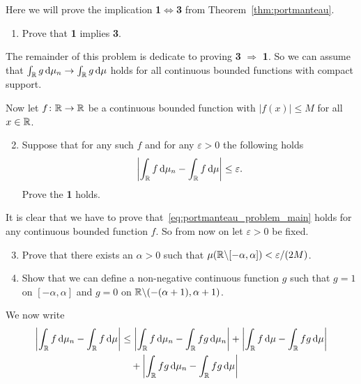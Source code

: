 \begin{problem}\label{prb:portmanteau}
Here we will prove the implication \textbf{1$\iff$3} from Theorem~\ref{thm:portmanteau}. 

\begin{enumerate}[label={(\alph*)}]
\item Prove that \textbf{1} implies \textbf{3}.
\end{enumerate}

The remainder of this problem is dedicate to proving \textbf{3} $\Rightarrow$ \textbf{1}. So we can assume that $\int_{\mathbb R} g \, \mathrm{d} \mu_n \to \int_{\mathbb R} g \, \mathrm{d} \mu$ holds for all continuous bounded functions with compact support.

Now let $f\colon \mathbb R \to \mathbb R$ be a continuous bounded function with $|f(x)| \le M$ for all $x \in \mathbb R$.
\begin{enumerate}[label={(\alph*)}]
\setcounter{enumi}{1}
\item Suppose that for any such $f$ and for any $\varepsilon > 0$ the following holds
\begin{equation}\label{eq:portmanteau_problem_main}
	\left|\int_{\mathbb R} f \, \mathrm{d} \mu_n - \int_{\mathbb R} f \, \mathrm{d} \mu\right| \le \varepsilon.
\end{equation}
Prove the \textbf{1} holds.
\end{enumerate}

It is clear that we have to prove that~\eqref{eq:portmanteau_problem_main} holds for any continuous bounded function $f$. So from now on let $\varepsilon > 0$ be fixed.
\begin{enumerate}[label={(\alph*)}]
\setcounter{enumi}{2}
\item Prove that there exists an $\alpha > 0$ such that $\mu(\mathbb R \backslash [-\alpha, \alpha]) < \varepsilon/(2M)$.
\item Show that we can define a non-negative continuous function $g$ such that $g = 1$ on $[-\alpha, \alpha]$ and $g = 0$ on $\mathbb R \backslash (-(\alpha+1),\alpha+1)$.
\end{enumerate}

We now write 
\begin{align*}
	\left|\int_{\mathbb R} f \, \mathrm{d} \mu_n - \int_{\mathbb R} f \, \mathrm{d} \mu\right| &\le \left|\int_{\mathbb R} f \, \mathrm{d} \mu_n - \int_{\mathbb R} fg \, \mathrm{d} \mu_n\right| + \left|\int_{\mathbb R} f \, \mathrm{d} \mu - \int_{\mathbb R} fg \, \mathrm{d} \mu\right|\\ &\hspace{10pt}+ \left|\int_{\mathbb R} fg \, \mathrm{d} \mu_n - \int_{\mathbb R} fg \, \mathrm{d} \mu\right|
\end{align*}


\end{problem}
